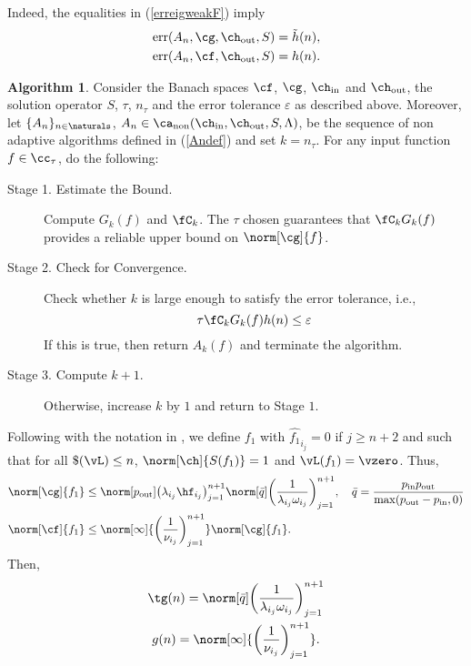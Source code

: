 \documentclass[final]{elsarticle}
\newcommand{\chin}{\ch_{\text{\rm{in}}}}
\newcommand{\chout}{\ch_{\text{\rm{out}}}}
\newcommand{\pin}{p_{\text{\rm{in}}}}
\newcommand{\pout}{p_{\text{\rm{out}}}}
\DeclareMathOperator{\err}{err}
\DeclareMathOperator{\non}{non}
\theoremstyle{definition}
\newtheorem{algo}{Algorithm}
\theoremstyle{remark}
\begin{document}
Indeed, the equalities in (\ref{erreigweakF}) imply
\begin{gather}
\err(A_{n},\cg,\chout,S) = \tilde{h}(n),\\
\err(A_{n},\cf,\chout,S) = h(n).
\end{gather}

\begin{algo}\label{algo1}
 Consider the Banach spaces $\cf$, $\cg$, $\chin$ and $\chout$, the solution operator $S$, $\tau$, $n_\tau$ and the error tolerance $\varepsilon$ as described above. Moreover, let $\{A_n\}_{n\in\naturals}$, $A_n\in\ca_{\non}(\chin,\chout,S,\Lambda)$, be the sequence of non adaptive algorithms defined in (\ref{Andef}) and set $k=n_\tau$. For any input function $f\in\cc_\tau$, do the following:
\begin{description}
\item[Stage 1. Estimate the Bound.] Compute $G_{k}(f)$ and $\fC_{k}$. The $\tau$ chosen guarantees that $\fC_{k}G_{k}(f)$ provides a reliable upper bound on $\norm[\cg]{f}$.
\item[Stage 2. Check for Convergence.] Check whether $k$ is large enough to satisfy the error tolerance, i.e.,
    \begin{equation}
          \tau \fC_{k} G_{k}(f) h(n) \le \varepsilon
    \end{equation}
    If this is true, then return $A_{k}(f)$ and terminate the algorithm.
\item[Stage 3. Compute $k+1$.] Otherwise, increase $k$ by $1$ and return to Stage $1$.
\end{description}
\end{algo}

Following with the notation in \cite[p.\ 20]{HicEtal14b}, we define $f_1$ with $\hat{f_1}_{i_j}=0$ if $j\ge n+2$ and such that for all $\$(\vL)\le n$, $\norm[\ch]{S(f_1)} = 1$ and $\vL(f_1)= \vzero$. Thus,
\begin{align*}
\norm[\cg]{f_1} & \le \norm[\pout]{\left(\lambda_{i_j} \hf_{i_j} \right)_{j = 1}^{n+1}}\norm[\bar{q}]{\left(\frac{1}{\lambda_{i_j} \omega_{i_j}} \right)_{j = 1}^{n+1}},\quad \bar{q}= \frac{\pin\pout}{\max(\pout-\pin,0)} \\
\norm[\cf]{f_1} & \le \norm[\infty]{\left(\frac{1}{\nu_{i_j}} \right)_{j = 1}^{n+1}} \norm[\cg]{f_1}.
\end{align*}
Then,
\begin{gather}
\tg(n) = \norm[\bar{q}]{\left(\frac{1}{\lambda_{i_j} \omega_{i_j}} \right)_{j = 1}^{n+1}}\\
g(n) = \norm[\infty]{\left(\frac{1}{\nu_{i_j}} \right)_{j = 1}^{n+1}}.
\end{gather}
\end{document}
